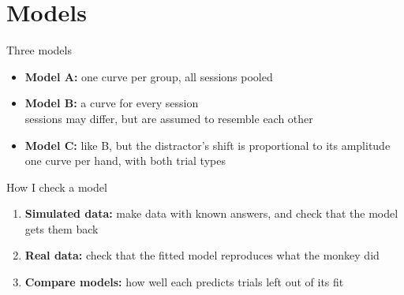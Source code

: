 \section{Models}

\begin{frame}{Three models}
  \begin{itemize}
    \setlength{\itemsep}{1em}
    \item \textbf{Model A:} one curve per group, all sessions pooled
    \item \textbf{Model B:} a curve for every session\\
          {\color{muted}sessions may differ, but are assumed to resemble each other}
    \item \textbf{Model C:} like B, but the distractor's shift is proportional to its
          amplitude\\
          {\color{muted}one curve per hand, with both trial types}
  \end{itemize}
\end{frame}

\begin{frame}{How I check a model}
  \begin{enumerate}
    \setlength{\itemsep}{1em}
    \item \textbf{Simulated data:} make data with known answers, and check that the model
          gets them back
    \item \textbf{Real data:} check that the fitted model reproduces what the monkey did
    \item \textbf{Compare models:} how well each predicts trials left out of its fit
  \end{enumerate}
\end{frame}
